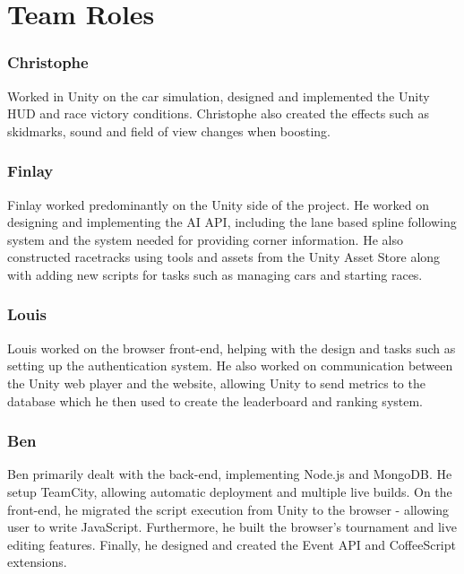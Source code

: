 \iffalse
Since we using git for our version control, and Github as our host for the project, we made use of Github's in-built issue tracking system. (Currently we use Trello to flag up issues, sometimes breaking our task board story-system by making a new card just for the issue. Using a dedicated system could help organise what problems we are having, in particular which issues are preventing further work from being completed. However, Github's 'Issues' feature isn't just restricted to bug fixes; it can be used for enhancements and keeping track of who is working on what, so it might be worth using this as an alternative, or in addition to Trello.) (Did we even use this?)
\fi

\section{Team Roles}
\subsubsection{Christophe}
Worked in Unity on the car simulation, designed and implemented the Unity HUD and race victory conditions. Christophe also created the effects such as skidmarks, sound and field of view changes when boosting.

\subsubsection{Finlay}
Finlay worked predominantly on the Unity side of the project. He worked on designing and implementing the AI API, including the lane based spline following system and the system needed for providing corner information. He also constructed racetracks using tools and assets from the Unity Asset Store along with adding new scripts for tasks such as managing cars and starting races.

\subsubsection{Louis}
Louis worked on the browser front-end, helping with the design and tasks such as setting up the authentication system. He also worked on communication between the Unity web player and the website, allowing Unity to send metrics to the database which he then used to create the leaderboard and ranking system.

\subsubsection{Ben}
Ben primarily dealt with the back-end, implementing Node.js and MongoDB. He setup TeamCity, allowing automatic deployment and multiple live builds.  On the front-end, he migrated the script execution from Unity to the browser - allowing user to write JavaScript. Furthermore, he built the browser's tournament and live editing features. Finally, he designed and created the Event API and CoffeeScript extensions.


